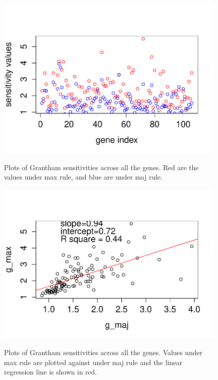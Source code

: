 \documentclass[13pt]{article}
\begin{document}
\begin{figure}[h]
\caption{Plots of Grantham sensitivities across all the genes. Red are the values under max rule, and blue are under maj rule.}
\centering
\includegraphics[width=\textwidth]{gvalue_max_maj.pdf}
\label{fig:gvalue}
\end{figure}

\begin{figure}[h]
\caption{Plots of Grantham sensitivities across all the genes. Values under max rule are plotted against under maj rule and the linear regression line is shown in red.}
\centering
\includegraphics[width=\textwidth]{gvalue.pdf}
\label{fig:gvaluecorr}
\end{figure}
\end{document}
